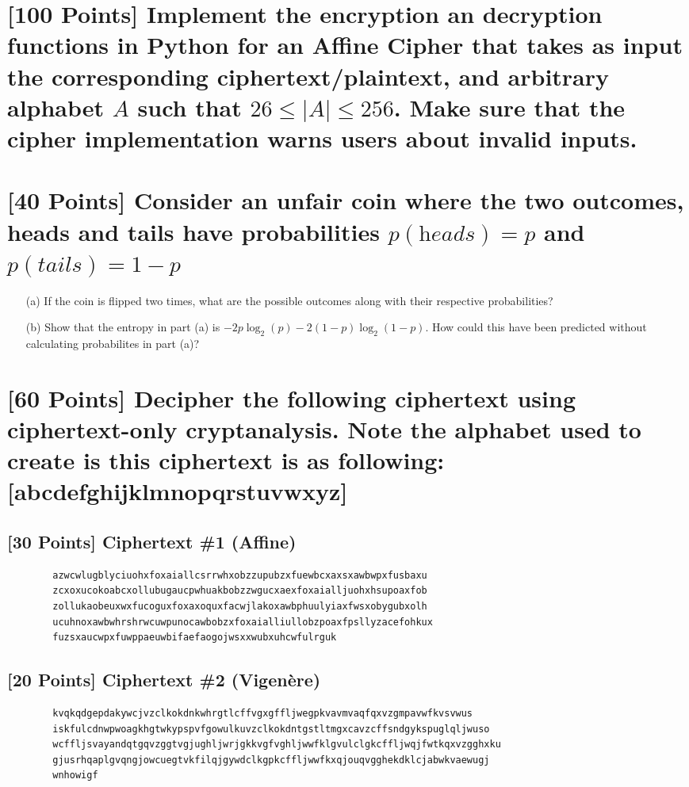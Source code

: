 \documentclass{article}
\begin{document}
    \section*{[100 Points] Implement the encryption an decryption functions in Python for an Affine Cipher that takes as input the corresponding ciphertext/plaintext, and  arbitrary alphabet $A$ such that  $26 \leq |A| \leq 256$. Make sure that the cipher implementation warns users about invalid inputs.}


    \section*{[40 Points] Consider an unfair coin where the two outcomes, heads and tails have probabilities $p(\textit{heads})=p$ and $p(\textit{tails})=1-p$}
    \begin{enumerate}
      \item [(a)] If the coin is flipped two times, what are the possible outcomes along with their respective probabilities?
      \item [(b)] Show that the entropy in part (a) is $-2p\log_2(p)-2(1-p)\log_{2}(1-p)$. How could this have been predicted without calculating probabilites in part (a)?
    \end{enumerate}

    \section*{[60 Points] Decipher the following ciphertext using ciphertext-only cryptanalysis. Note the alphabet used to create is this ciphertext is as following: [abcdefghijklmnopqrstuvwxyz]}

    \subsection*{[30 Points] Ciphertext \#1 (Affine)}
    \begin{verbatim}
        azwcwlugblyciuohxfoxaiallcsrrwhxobzzupubzxfuewbcxaxsxawbwpxfusbaxu
        zcxoxucokoabcxollubugaucpwhuakbobzzwgucxaexfoxaialljuohxhsupoaxfob
        zollukaobeuxwxfucoguxfoxaxoquxfacwjlakoxawbphuulyiaxfwsxobygubxolh
        ucuhnoxawbwhrshrwcuwpunocawbobzxfoxaialliullobzpoaxfpsllyzacefohkux
        fuzsxaucwpxfuwppaeuwbifaefaogojwsxxwubxuhcwfulrguk
    \end{verbatim}

    \subsection*{[20 Points] Ciphertext \#2 (Vigen\`{e}re)}
    \begin{verbatim}
        kvqkqdgepdakywcjvzclkokdnkwhrgtlcffvgxgffljwegpkvavmvaqfqxvzgmpavwfkvsvwus
        iskfulcdnwpwoagkhgtwkypspvfgowulkuvzclkokdntgstltmgxcavzcffsndgykspuglqljwuso
        wcffljsvayandqtgqvzggtvgjughljwrjgkkvgfvghljwwfklgvulclgkcffljwqjfwtkqxvzgghxku
        gjusrhqaplgvqngjowcuegtvkfilqjgywdclkgpkcffljwwfkxqjouqvgghekdklcjabwkvaewugj
        wnhowigf
    \end{verbatim}
\end{document}
